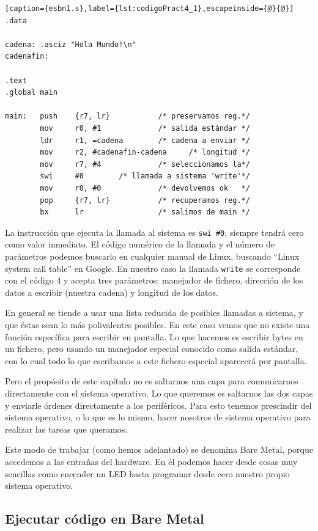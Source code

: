 \begin{lstlisting}[caption={esbn1.s},label={lst:codigoPract4_1},escapeinside={@}{@}]
.data

cadena: .asciz "Hola Mundo!\n"
cadenafin:

.text
.global main
 
main:   push    {r7, lr}           /* preservamos reg.*/
        mov     r0, #1             /* salida estándar */
        ldr     r1, =cadena        /* cadena a enviar */
        mov     r2, #cadenafin-cadena     /* longitud */
        mov     r7, #4             /* seleccionamos la*/
        swi     #0        /* llamada a sistema 'write'*/
        mov     r0, #0             /* devolvemos ok   */
        pop     {r7, lr}           /* recuperamos reg.*/
        bx      lr                 /* salimos de main */
\end{lstlisting}

La instrucción que ejecuta la llamada al sistema es {\tt swi \#0},
siempre tendrá cero como valor inmediato. El código numérico de
la llamada y el número de parámetros podemos buscarlo en cualquier
manual de Linux, buscando ``Linux system call table'' en Google. En
nuestro caso la llamada {\tt write} se corresponde con el código
4 y acepta tres parámetros: manejador de fichero, dirección de
los datos a escribir (nuestra cadena) y longitud de los datos.

En general se tiende a usar una lista reducida de posibles llamadas
a sistema, y que éstas sean lo más polivalentes posibles. En este
caso vemos que no existe una función específica para escribir en
pantalla. Lo que hacemos es escribir bytes en un fichero, pero usando
un manejador especial conocido como salida estándar, con lo cual todo
lo que escribamos a este fichero especial aparecerá por pantalla.

Pero el propósito de este capítulo no es saltarnos una capa
para comunicarnos directamente con el sistema operativo. Lo que queremos
es saltarnos las dos capas y enviarle órdenes directamente a los periféricos.
Para esto tenemos prescindir del sistema operativo, o lo que es lo mismo,
hacer nosotros de sistema operativo para realizar las tareas que queramos.

Este modo de trabajar (como hemos adelantado) se denomina Bare Metal, porque
accedemos a las entrañas del hardware. En él podemos hacer desde cosas
muy sencillas como encender un LED hasta programar desde cero nuestro propio
sistema operativo.

\subsection{Ejecutar código en Bare Metal}

